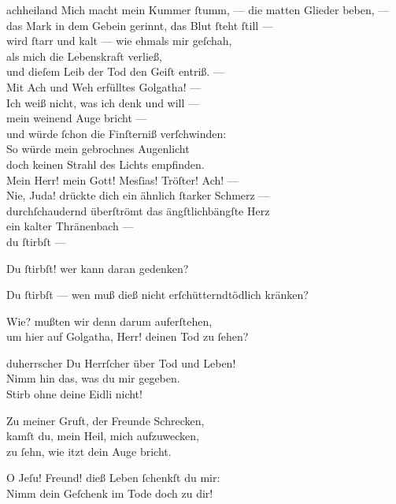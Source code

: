 \documentclass[shorttitlesize=50,tocstyle=ref-genre]{ees}
\begin{document}
{\begin{movement}{achheiland}
    \voice[Lazarus]
    Mich macht mein Kummer ſtumm, — die matten Glieder beben, —\\
    das Mark in dem Gebein gerinnt, das Blut ſteht ſtill —\\
    wird ſtarr und kalt — wie ehmals mir geſchah,\\
    als mich die Lebenskraft verließ,\\
    und dieſem Leib der Tod den Geiſt entriß. —\\
    Mit Ach und Weh erfülltes Golgatha! —\\
    Ich weiß nicht, was ich denk und will —\\
    mein weinend Auge bricht —\\
    und würde ſchon die Finſterniß verſchwinden:\\
    So würde mein gebrochnes Augenlicht\\
    doch keinen Strahl des Lichts empfinden.\\
    Mein Herr! mein Gott! Mesſias! Tröſter! Ach! —\\
    Nie, Juda! drückte dich ein ähnlich ſtarker Schmerz —\\
    durchſchaudernd überſtrömt das ängſtlichbängſte Herz\\
    ein kalter Thränenbach —\\
    du ſtirbſt —

    \voice[Eidli]
    \hspace*{3cm}Du ſtirbſt! wer kann daran gedenken?

    \voice[Lazarus]
    Du ſtirbſt — wen muß dieß nicht erſchütterndtödlich kränken?

    Wie? mußten wir denn darum auferſtehen,\\
    um hier auf Golgatha, Herr! deinen Tod zu ſehen?
  \end{movement}

  \begin{movement}{duherrscher}
    \voice[Eidli]
    Du Herrſcher über Tod und Leben!\\
    Nimm hin das, was du mir gegeben.\\
    Stirb ohne deine Eidli nicht!

    \voice[Lazarus]
    Zu meiner Gruft, der Freunde Schrecken,\\
    kamſt du, mein Heil, mich aufzuwecken,\\
    zu ſehn, wie itzt dein Auge bricht.

    O Jeſu! Freund! dieß Leben ſchenkſt du mir:\\
    Nimm dein Geſchenk im Tode doch zu dir!


\end{movement}}
\end{document}
